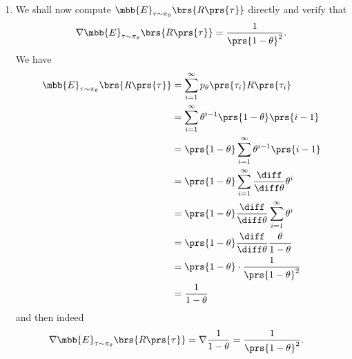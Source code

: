 \documentclass[10pt]{article}
\theoremstyle{definition}
\begin{document}
\begin{enumerate}
\begin{enumerate}[label=(\alph*)]
\item We shall now compute $\mbb{E}_{\tau \sim \pi_\theta}\brs{R\prs{\tau}}$ directly and verify that \[\nabla \mbb{E}_{\tau \sim \pi_\theta}\brs{R\prs{\tau}} = \frac{1}{\prs{1 - \theta}^2} \text{.}\]
We have
\begin{align*}
\mbb{E}_{\tau \sim \pi_\theta}\brs{R\prs{\tau}} &= \sum_{i = 1}^{\infty} p_{\theta}\prs{\tau_i} R\prs{\tau_i}
\\&=
\sum_{i=1}^{\infty} \theta^{i-1} \prs{1 - \theta} \prs{i-1}
\\&=
\prs{1 - \theta} \sum_{i = 1}^{\infty} \theta^{i-1} \prs{i-1}
\\&=
\prs{1 - \theta} \sum_{i=1}^{\infty} \frac{\diff}{\diff \theta} \theta^i
\\&=
\prs{1 - \theta} \frac{\diff}{\diff \theta} \sum_{i=1}^{\infty} \theta^i
\\&=
\prs{1 - \theta} \frac{\diff}{\diff \theta} \frac{\theta}{1 - \theta}
\\&=
\prs{1 - \theta} \cdot \frac{1}{\prs{1 - \theta}^2}
\\&= \frac{1}{1 - \theta}
\end{align*}
and then indeed
\begin{align*}
\nabla \mbb{E}_{\tau \sim \pi_\theta}\brs{R\prs{\tau}} &= \nabla \frac{1}{1 - \theta} = \frac{1}{\prs{1 - \theta}^2} \text{.}
\end{align*}
\end{enumerate}


\end{enumerate}
\end{document}
